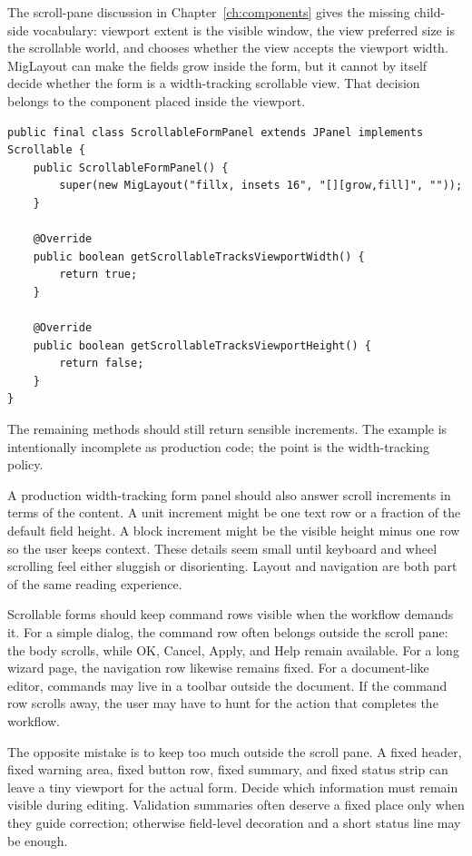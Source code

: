 The scroll-pane discussion in Chapter~\ref{ch:components} gives the missing
child-side vocabulary: viewport extent is the visible window, the view preferred
size is the scrollable world, and 
chooses whether the view accepts the viewport width. MigLayout can make the
fields grow inside the form, but it cannot by itself decide whether the form is
a width-tracking scrollable view. That decision belongs to the component placed
inside the viewport.

\begin{lstlisting}[caption={A small width-tracking form panel for scroll panes.}]
public final class ScrollableFormPanel extends JPanel implements Scrollable {
    public ScrollableFormPanel() {
        super(new MigLayout("fillx, insets 16", "[][grow,fill]", ""));
    }

    @Override
    public boolean getScrollableTracksViewportWidth() {
        return true;
    }

    @Override
    public boolean getScrollableTracksViewportHeight() {
        return false;
    }
}
\end{lstlisting}

The remaining  methods should still return sensible increments. The example is intentionally incomplete as production code; the point is the width-tracking policy.

A production width-tracking form panel should also answer scroll increments in
terms of the content. A unit increment might be one text row or a fraction of
the default field height. A block increment might be the visible height minus
one row so the user keeps context. These details seem small until keyboard and
wheel scrolling feel either sluggish or disorienting. Layout and navigation are
both part of the same reading experience.

Scrollable forms should keep command rows visible when the workflow demands it.
For a simple dialog, the command row often belongs outside the scroll pane: the
body scrolls, while OK, Cancel, Apply, and Help remain available. For a long
wizard page, the navigation row likewise remains fixed. For a document-like
editor, commands may live in a toolbar outside the document. If the command row
scrolls away, the user may have to hunt for the action that completes the
workflow.

The opposite mistake is to keep too much outside the scroll pane. A fixed
header, fixed warning area, fixed button row, fixed summary, and fixed status
strip can leave a tiny viewport for the actual form. Decide which information
must remain visible during editing. Validation summaries often deserve a fixed
place only when they guide correction; otherwise field-level decoration and a
short status line may be enough.

